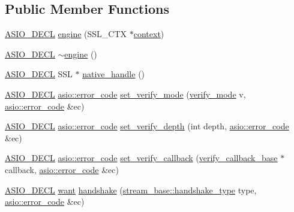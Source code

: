 \subsection*{Public Member Functions}
\begin{DoxyCompactItemize}
\item 
\hyperlink{config_8hpp_ab54d01ea04afeb9a8b39cfac467656b7}{A\+S\+I\+O\+\_\+\+D\+E\+C\+L} \hyperlink{classasio_1_1ssl_1_1detail_1_1engine_ab6da5aa61c3e6c3477addf2cc00ecdbd}{engine} (S\+S\+L\+\_\+\+C\+T\+X $\ast$\hyperlink{classasio_1_1ssl_1_1context}{context})
\item 
\hyperlink{config_8hpp_ab54d01ea04afeb9a8b39cfac467656b7}{A\+S\+I\+O\+\_\+\+D\+E\+C\+L} \hyperlink{classasio_1_1ssl_1_1detail_1_1engine_aa5661a6092bf529b6acbcf8d20c6ad14}{$\sim$engine} ()
\item 
\hyperlink{config_8hpp_ab54d01ea04afeb9a8b39cfac467656b7}{A\+S\+I\+O\+\_\+\+D\+E\+C\+L} S\+S\+L $\ast$ \hyperlink{classasio_1_1ssl_1_1detail_1_1engine_a67b96b4ee4bdc3b0b789730af1f68f84}{native\+\_\+handle} ()
\item 
\hyperlink{config_8hpp_ab54d01ea04afeb9a8b39cfac467656b7}{A\+S\+I\+O\+\_\+\+D\+E\+C\+L} \hyperlink{classasio_1_1error__code}{asio\+::error\+\_\+code} \hyperlink{classasio_1_1ssl_1_1detail_1_1engine_a6242fc54e94b692d29f7b7534b3643cc}{set\+\_\+verify\+\_\+mode} (\hyperlink{namespaceasio_1_1ssl_aa6497e51bc608f2397a731a14f80b563}{verify\+\_\+mode} v, \hyperlink{classasio_1_1error__code}{asio\+::error\+\_\+code} \&ec)
\item 
\hyperlink{config_8hpp_ab54d01ea04afeb9a8b39cfac467656b7}{A\+S\+I\+O\+\_\+\+D\+E\+C\+L} \hyperlink{classasio_1_1error__code}{asio\+::error\+\_\+code} \hyperlink{classasio_1_1ssl_1_1detail_1_1engine_a8bd3ece8dd2b1a1c06f3df5a72969c3c}{set\+\_\+verify\+\_\+depth} (int depth, \hyperlink{classasio_1_1error__code}{asio\+::error\+\_\+code} \&ec)
\item 
\hyperlink{config_8hpp_ab54d01ea04afeb9a8b39cfac467656b7}{A\+S\+I\+O\+\_\+\+D\+E\+C\+L} \hyperlink{classasio_1_1error__code}{asio\+::error\+\_\+code} \hyperlink{classasio_1_1ssl_1_1detail_1_1engine_a7b375f00550e82dd6e379d8ebd2e8db5}{set\+\_\+verify\+\_\+callback} (\hyperlink{classasio_1_1ssl_1_1detail_1_1verify__callback__base}{verify\+\_\+callback\+\_\+base} $\ast$callback, \hyperlink{classasio_1_1error__code}{asio\+::error\+\_\+code} \&ec)
\item 
\hyperlink{config_8hpp_ab54d01ea04afeb9a8b39cfac467656b7}{A\+S\+I\+O\+\_\+\+D\+E\+C\+L} \hyperlink{classasio_1_1ssl_1_1detail_1_1engine_ab9812153941a6a93c9095f4e5ca8f915}{want} \hyperlink{classasio_1_1ssl_1_1detail_1_1engine_ac31b70e92ff614d173c7c9111dcc1d8c}{handshake} (\hyperlink{classasio_1_1ssl_1_1stream__base_a2f18813d3860bc8aee99249834d7c320}{stream\+\_\+base\+::handshake\+\_\+type} type, \hyperlink{classasio_1_1error__code}{asio\+::error\+\_\+code} \&ec)

\end{DoxyCompactItemize}
